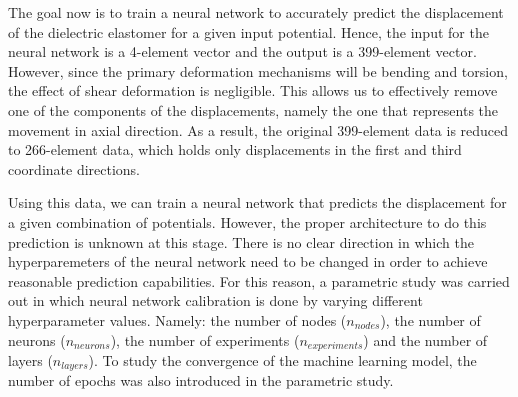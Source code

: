 The goal now is to train a neural network to accurately predict the displacement of the dielectric elastomer for a given input potential. Hence, the input for the neural network is a 4-element vector and the output is a 399-element vector. However, since the primary deformation mechanisms will be bending and torsion, the effect of shear deformation is negligible. This allows us to effectively remove one of the components of the displacements, namely the one that represents the movement in axial direction. As a result, the original 399-element data is reduced to 266-element data, which holds only displacements in the first and third coordinate directions. 

Using this data, we can train a neural network that predicts the displacement for a given combination of potentials. However, the proper architecture to do this prediction is unknown at this stage. There is no clear direction in which the hyperparemeters of the neural network need to be changed in order to achieve reasonable prediction capabilities. For this reason, a parametric study was carried out in which neural network calibration is done by varying different hyperparameter values. Namely: the number of nodes ($n_{nodes}$), the number of neurons ($n_{neurons}$), the number of experiments ($n_{experiments}$) and the number of layers ($n_{layers}$). To study the convergence of the machine learning model, the number of epochs was also introduced in the parametric study.



